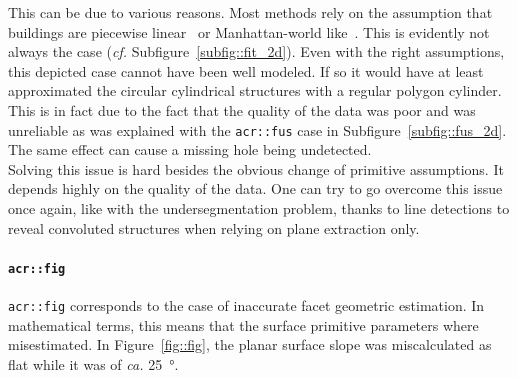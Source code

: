                 This can be due to various reasons.
                Most methods rely on the assumption that buildings are piecewise linear~\parencite{nan2017polyfit} or Manhattan-world like~\parencite{li2016manhattan}.
                This is evidently not always the case (\textit{cf.} Subfigure~\ref{subfig::fit_2d}).
                Even with the right assumptions, this depicted case cannot have been well modeled.
                If so it would have at least approximated the circular cylindrical structures with a regular polygon cylinder.
                This is in fact due to the fact that the quality of the data was poor and was unreliable as was explained with the \texttt{\gls{acr::fus}} case in Subfigure~\ref{subfig::fus_2d}.
                The same effect can cause a missing hole being undetected.\\

                Solving this issue is hard besides the obvious change of primitive assumptions.
                It depends highly on the quality of the data.
                One can try to go overcome this issue once again, like with the undersegmentation problem, thanks to line detections to reveal convoluted structures when relying on plane extraction only. 

            \paragraph{\texttt{\acrlong*{acr::fig}}}
                \texttt{\gls{acr::fig}} corresponds to the case of inaccurate facet geometric estimation.
                In mathematical terms, this means that the surface primitive parameters where misestimated.
                In Figure~\ref{fig::fig}, the planar surface slope was miscalculated as flat while it was of \textit{ca.} \SI{25}{\degree}.\\

